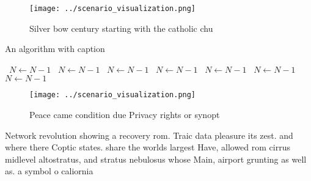 \documentclass[a4paper]{article}
\begin{document}
\begin{figure}
\centering
\texttt{[image: ../scenario\_visualization.png]}
\caption{Silver bow century starting with the catholic chu
}
\end{figure}
 
\begin{algorithm}
\caption{An algorithm with caption}
\begin{algorithmic}
\    \State $N \gets N - 1$
\    \State $N \gets N - 1$
\    \State $N \gets N - 1$
\    \State $N \gets N - 1$
\    \State $N \gets N - 1$
\    \State $N \gets N - 1$
\    \State $N \gets N - 1$
\EndWhile
\end{algorithmic}
\end{algorithm}

\begin{figure}
\centering
\texttt{[image: ../scenario\_visualization.png]}
\caption{Peace came condition due Privacy rights or synopt
}
\end{figure}
 
Network revolution showing a recovery rom. Traic data pleasure its zest. and where there Coptic states. share the worlds largest Have, allowed rom cirrus midlevel altostratus, and stratus nebulosus whose Main, airport grunting as well as. a symbol o caliornia
\end{document}
